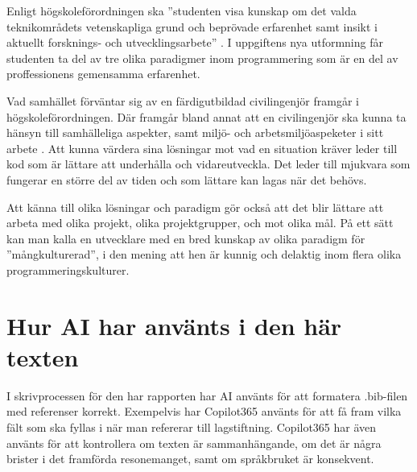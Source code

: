 \documentclass[a4paper, 10pt]{article}
\begin{document}
Enligt högskoleförordningen ska ''studenten visa 
kunskap om det valda teknikområdets vetenskapliga 
grund och beprövade erfarenhet samt insikt i 
aktuellt forsknings- och utvecklingsarbete''
\parencite{hogskoleforordningen2025}. I uppgiftens 
nya utformning får studenten ta del av tre olika 
paradigmer inom programmering som är en del av 
proffessionens gemensamma erfarenhet.

Vad samhället förväntar sig av en färdigutbildad 
civilingenjör framgår i högskoleförordningen.
Där framgår bland annat att en civilingenjör ska 
kunna ta hänsyn till samhälleliga aspekter, samt 
miljö- och arbetsmiljöaspeketer i sitt arbete 
\parencite{hogskoleforordningen2025}. 
Att kunna värdera sina lösningar mot vad en 
situation kräver leder till kod som är lättare 
att underhålla och vidareutveckla. Det leder 
till mjukvara som fungerar en större del av tiden 
och som lättare kan lagas när det behövs.

Att känna till olika lösningar och paradigm 
gör också att det blir lättare att arbeta med 
olika projekt, olika projektgrupper, och mot 
olika mål. På ett sätt kan man kalla en 
utvecklare med en bred kunskap av olika 
paradigm för ''mångkulturerad'', i den mening 
att hen är kunnig och delaktig inom flera 
olika programmeringskulturer. 

\section{Hur AI har använts i den här texten}

I skrivprocessen för den har rapporten har 
AI använts för att formatera .bib-filen med 
referenser korrekt. Exempelvis har Copilot365 
använts för att få fram vilka fält som ska 
fyllas i när man refererar till lagstiftning.
Copilot365 har även använts för att kontrollera om 
texten är sammanhängande, om det är några 
brister i det framförda resonemanget, samt om 
språkbruket är konsekvent. 


\end{document}
